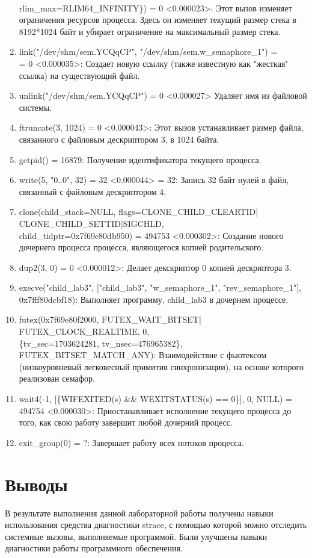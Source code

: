 \documentclass[a4paper, 12pt]{article}
\begin{document}
\begin{enumerate}
    \\rlim\_max=RLIM64\_INFINITY\}) = 0 <0.000023>: Этот вызов изменяет ограничения ресурсов процесса. Здесь он изменяет текущий размер стека в 8192*1024 байт и убирает ограничение на максимальный размер стека.
    \item link("/dev/shm/sem.YCQqCP", "/dev/shm/sem.w\_semaphore\_1") = \\ = 0 <0.000035>: Создает новую ссылку (также известную как "жесткая" ссылка) на существующий файл. 
    \item unlink("/dev/shm/sem.YCQqCP")           = 0 <0.000027> Удаляет имя из файловой системы.
    \item ftruncate(3, 1024) = 0 <0.000043>: Этот вызов устанавливает размер файла, связанного с файловым дескриптором 3, в 1024 байта.
    \item getpid() = 16879: Получение идентификатора текущего процесса.
    \item write(5, "0..0", 32) = 32 <0.000044>
    = 32: Запись 32 байт нулей в файл, связанный с файловым дескриптором 4.
    \item clone(child\_stack=NULL, flags=CLONE\_CHILD\_CLEARTID|\\CLONE\_CHILD\_SETTID|SIGCHLD, \\child\_tidptr=0x7f69e80db950) = 494753 <0.000302>: Создание нового дочернего процесса процесса, являющегося копией родительского.
    \item dup2(3, 0) = 0 <0.000012>: Делает декскриптор 0 копией дескриптора 3.
    \item execve("child\_lab3", ["child\_lab3", "w\_semaphore\_1", "rev\_semaphore\_1"], \\0x7fff80dcbf18): Выполняет программу, child\_lab3 в дочернем процессе.
    \item futex(0x7f69e80f2000, FUTEX\_WAIT\_BITSET|\\FUTEX\_CLOCK\_REALTIME, 0, \\\{tv\_sec=1703624281, tv\_nsec=476965382\}, \\FUTEX\_BITSET\_MATCH\_ANY): Взаимодействие с фьютексом (низкоуровневый легковесный примитив синхронизации), на основе которого реализован семафор.
    \item wait4(-1, [\{WIFEXITED(s) \&\& WEXITSTATUS(s) == 0\}], 0, NULL) = 494754 <0.000030>:  Приостанавливает исполнение текущего процесса до того, как свою работу завершит любой дочерний процесс. 
    \item exit\_group(0) = ?: Завершает работу всех потоков процесса.

\end{enumerate}

\newpage
\section{Выводы}

В результате выполнения данной лабораторной работы получены навыки использования средства диагностики strace, с помощью которой можно отследить системные вызовы, выполняемые программой. Были улучшены навыки диагностики работы программного обеспечения.
\end{document}
